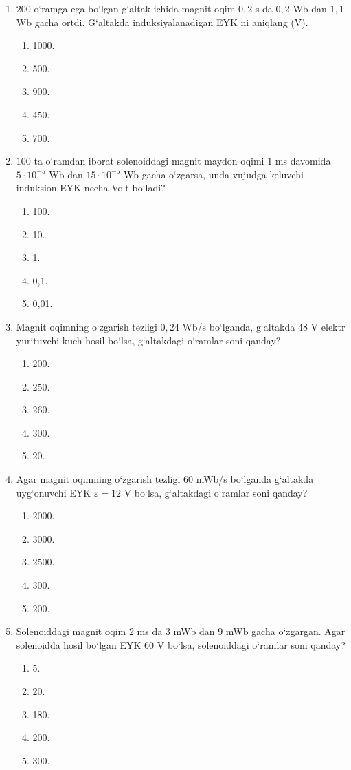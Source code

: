 \begin{enumerate}
\item $200$ o‘ramga ega bo‘lgan g‘altak ichida magnit oqim $0,2$ s da $0,2$ Wb dan $1,1$ Wb gacha ortdi. G‘altakda induksiyalanadigan EYK ni aniqlang (V).
\begin{enumerate}[label=\Alph*)]
\item 1000.
\item 500.
\item 900.
\item 450.
\item 700.
\end{enumerate}

\item $100$ ta o‘ramdan iborat solenoiddagi magnit maydon oqimi $1$ ms davomida $5\cdot10^{-5}$ Wb dan $15\cdot10^{-5}$ Wb gacha o‘zgarsa, unda vujudga keluvchi induksion EYK necha Volt bo‘ladi?
\begin{enumerate}[label=\Alph*)]
\item 100.
\item 10.
\item 1.
\item 0,1.
\item 0,01.
\end{enumerate}

\item Magnit oqimning o‘zgarish tezligi $0,24$ Wb/s bo‘lganda, g‘altakda $48$ V elektr yurituvchi kuch hosil bo‘lsa, g‘altakdagi o‘ramlar soni qanday?
\begin{enumerate}[label=\Alph*)]
\item 200.
\item 250.
\item 260.
\item 300.
\item 20.
\end{enumerate}

\item Agar magnit oqimning o‘zgarish tezligi $60$ mWb/s bo‘lganda g‘altakda uyg‘onuvchi EYK $\varepsilon=12$ V bo‘lsa, g‘altakdagi o‘ramlar soni qanday?
\begin{enumerate}[label=\Alph*)]
\item 2000.
\item 3000.
\item 2500.
\item 300.
\item 200.
\end{enumerate}

\item Solenoiddagi magnit oqim $2$ ms da $3$ mWb dan $9$ mWb gacha o‘zgargan. Agar solenoidda hosil bo‘lgan EYK $60$ V bo‘lsa, solenoiddagi o‘ramlar soni qanday?
\begin{enumerate}[label=\Alph*)]
\item 5.
\item 20.
\item 180.
\item 200.
\item 300.
\end{enumerate}


\end{enumerate}
